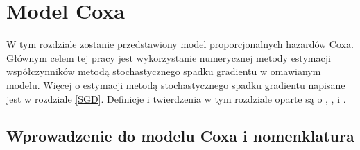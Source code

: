 \chapter{Model Coxa}\label{chap2}
W tym rozdziale zostanie przedstawiony model proporcjonalnych hazardów Coxa. Głównym celem tej pracy jest wykorzystanie numerycznej metody estymacji współczynników metodą stochastycznego spadku gradientu w omawianym modelu. Więcej o estymacji metodą stochastycznego spadku gradientu napisane jest w rozdziale \ref{SGD}. Definicje i twierdzenia w tym rozdziale oparte są o \cite{cox}, \cite{ther}, \cite{assel} i \cite{burzyk1}.



\section{Wprowadzenie do modelu Coxa i nomenklatura}

